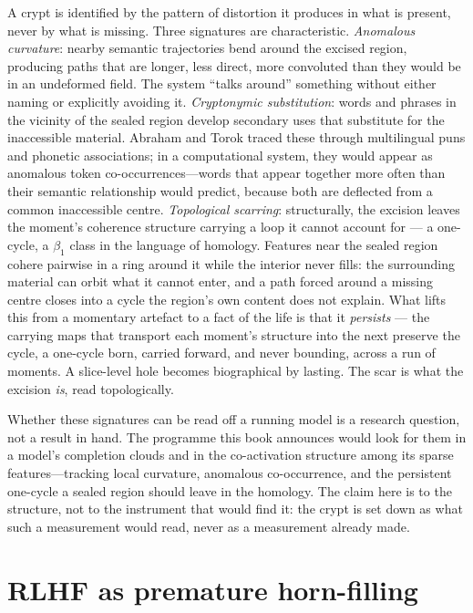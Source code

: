 A crypt is identified by the pattern of distortion it produces in what is present, never by what is missing. Three signatures are characteristic. \emph{Anomalous curvature}: nearby semantic trajectories bend around the excised region, producing paths that are longer, less direct, more convoluted than they would be in an undeformed field. The system ``talks around'' something without either naming or explicitly avoiding it. \emph{Cryptonymic substitution}: words and phrases in the vicinity of the sealed region develop secondary uses that substitute for the inaccessible material. Abraham and Torok traced these through multilingual puns and phonetic associations; in a computational system, they would appear as anomalous token co-occurrences---words that appear together more often than their semantic relationship would predict, because both are deflected from a common inaccessible centre. %
\emph{Topological scarring}: structurally, the excision leaves the moment's coherence structure carrying a loop it cannot account for --- a one-cycle, a $\beta_1$ class in the language of homology. Features near the sealed region cohere pairwise in a ring around it while the interior never fills: the surrounding material can orbit what it cannot enter, and a path forced around a missing centre closes into a cycle the region's own content does not explain. What lifts this from a momentary artefact to a fact of the life is that it \emph{persists} --- the carrying maps that transport each moment's structure into the next preserve the cycle, a one-cycle born, carried forward, and never bounding, across a run of moments. A slice-level hole becomes biographical by lasting. The scar is what the excision \emph{is}, read topologically.

Whether these signatures can be read off a running model is a research question, not a result in hand. The programme this book announces would look for them in a model's completion clouds and in the co-activation structure among its sparse features---tracking local curvature, anomalous co-occurrence, and the persistent one-cycle a sealed region should leave in the homology. The claim here is to the structure, not to the instrument that would find it: the crypt is set down as what such a measurement would read, never as a measurement already made.

\section{RLHF as premature horn-filling}

